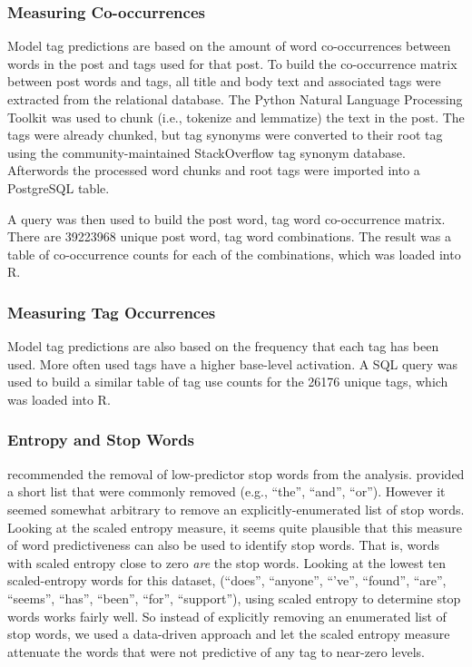 \documentclass[10pt,letterpaper]{article}
\begin{document}
\subsubsection{Measuring Co-occurrences}

Model tag predictions are based on the amount of word co-occurrences between words in the post and tags used for that post.
To build the co-occurrence matrix between post words and tags, all title and body text and associated tags were extracted from the relational database.
The Python Natural Language Processing Toolkit \cite{Bird2009} was used to chunk (i.e., tokenize and lemmatize) the text in the post.
The tags were already chunked, but tag synonyms were converted to their root tag using the community-maintained StackOverflow tag synonym database.
Afterwords the processed word chunks and root tags were imported into a PostgreSQL table.

A query was then used to build the post word, tag word co-occurrence matrix.
There are \num{39223968} unique post word, tag word combinations.
The result was a table of co-occurrence counts for each of the combinations, which was loaded into R.

\subsubsection{Measuring Tag Occurrences}

Model tag predictions are also based on the frequency that each tag has been used.
More often used tags have a higher base-level activation.
A SQL query was used to build a similar table of tag use counts for the \num{26176} unique tags, which was loaded into R.

\subsubsection{Entropy and Stop Words}

 recommended the removal of low-predictor stop words from the analysis.
\citeauthor{Bird2009} provided a short list that were commonly removed (e.g., ``the'', ``and'', ``or'').
However it seemed somewhat arbitrary to remove an explicitly-enumerated list of stop words.
Looking at the scaled entropy measure, it seems quite plausible that this measure of word predictiveness can also be used to identify stop words.
That is, words with scaled entropy close to zero \emph{are} the stop words.
Looking at the lowest ten scaled-entropy words for this dataset, (``does'', ``anyone'', ``'ve'', ``found'', ``are'', ``seems'', ``has'', ``been'', ``for'', ``support''),
using scaled entropy to determine stop words works fairly well.
So instead of explicitly removing an enumerated list of stop words, we used a data-driven approach and let the scaled entropy measure attenuate the words that were not predictive of any tag to near-zero levels.
\end{document}

